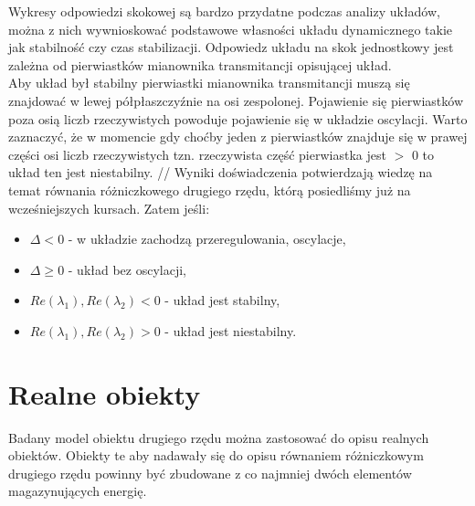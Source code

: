 \documentclass[a4paper]{article}
\begin{document}
            Wykresy odpowiedzi skokowej są bardzo przydatne podczas analizy układów, można z nich wywnioskować podstawowe własności układu dynamicznego takie jak stabilność czy czas stabilizacji.    
            Odpowiedz układu na skok jednostkowy jest zależna od pierwiastków mianownika transmitancji opisującej układ. \\
           \indent Aby układ był stabilny pierwiastki mianownika transmitancji muszą się znajdować w lewej półpłaszczyźnie na osi zespolonej. Pojawienie się pierwiastków poza osią liczb rzeczywistych powoduje pojawienie się w układzie oscylacji. Warto zaznaczyć, że w momencie gdy choćby jeden z pierwiastków znajduje się w prawej części osi liczb rzeczywistych tzn. rzeczywista część pierwiastka jest $>$ 0 to układ ten jest niestabilny.  //
           \indent Wyniki doświadczenia potwierdzają wiedzę na temat równania różniczkowego drugiego rzędu, którą posiedliśmy już na wcześniejszych kursach. Zatem jeśli:
           \begin{itemize}
               \item $\Delta < 0$ - w układzie zachodzą przeregulowania, oscylacje,
               \item $\Delta \geq 0$ - układ bez oscylacji,
               \item $Re(\lambda_1), Re(\lambda_2) < 0$ - układ jest stabilny,
               \item $Re(\lambda_1), Re(\lambda_2) > 0$ - układ jest niestabilny.
           \end{itemize}
        
    \section{Realne obiekty}
    Badany model obiektu drugiego rzędu można zastosować do opisu realnych obiektów. Obiekty te aby nadawały się do opisu równaniem różniczkowym drugiego rzędu powinny być zbudowane z co najmniej dwóch elementów magazynujących energię.   
    \newline
    
\end{document}
